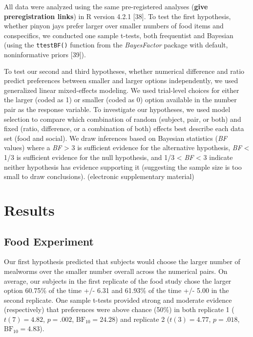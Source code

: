 \documentclass[
  ,doc,floatsintext]{apa6}
\begin{document}
All data were analyzed using the same pre-registered analyses (\textbf{give preregistration links}) in R version 4.2.1 {[}38{]}. To test the first hypothesis, whether pinyon jays prefer larger over smaller numbers of food items and conspecifics, we conducted one sample t-tests, both frequentist and Bayesian (using the \texttt{ttestBF()} function from the \emph{BayesFactor} package with default, noninformative priors {[}39{]}).

To test our second and third hypotheses, whether numerical difference and ratio predict preferences between smaller and larger options independently, we used generalized linear mixed-effects modeling. We used trial-level choices for either the larger (coded as 1) or smaller (coded as 0) option available in the number pair as the response variable. To investigate our hypotheses, we used model selection to compare which combination of random (subject, pair, or both) and fixed (ratio, difference, or a combination of both) effects best describe each data set (food and social). We draw inferences based on Bayesian statistics (\emph{BF} values) where a \emph{BF} \textgreater{} 3 is sufficient evidence for the alternative hypothesis, \emph{BF} \textless{} 1/3 is sufficient evidence for the null hypothesis, and 1/3 \textless{} \emph{BF} \textless{} 3 indicate neither hypothesis has evidence supporting it (suggesting the sample size is too small to draw conclusions). (electronic supplementary material)

\hypertarget{results}{%
\section{Results}\label{results}}

\hypertarget{food-experiment-1}{%
\subsection{Food Experiment}\label{food-experiment-1}}

Our first hypothesis predicted that subjects would choose the larger number of mealworms over the smaller number overall across the numerical pairs. On average, our subjects in the first replicate of the food study chose the larger option 60.75\% of the time +/- 6.31 and 61.93\% of the time +/- 5.00 in the second replicate. One sample t-tests provided strong and moderate evidence (respectively) that preferences were above chance (50\%) in both replicate 1 (\(t(7) = 4.82\), \(p = .002\), \(\mathrm{BF}_{\textrm{10}} = 24.28\)) and replicate 2 (\(t(3) = 4.77\), \(p = .018\), \(\mathrm{BF}_{\textrm{10}} = 4.83\)).
\end{document}

